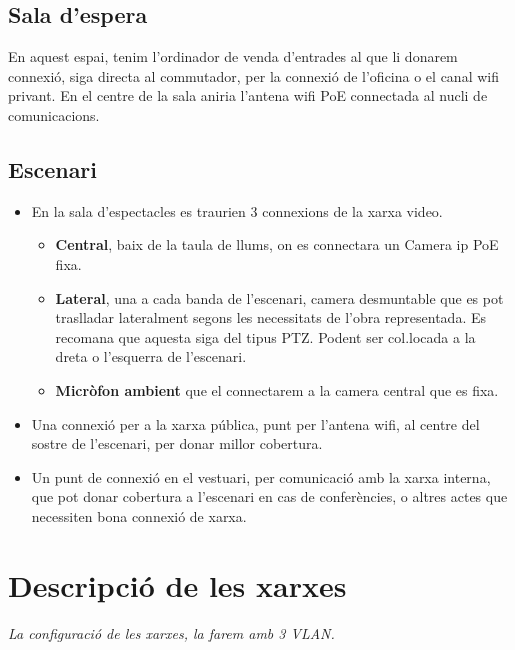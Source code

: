 \documentclass[
  10pt,
]{krantz}
\providecommand{\tightlist}{%
  \setlength{\itemsep}{0pt}\setlength{\parskip}{0pt}}
\begin{document}
\hypertarget{sala-despera}{%
\subsection{Sala d'espera}\label{sala-despera}}

En aquest espai, tenim l'ordinador de venda d'entrades al que li donarem connexió, siga directa al commutador, per la connexió de l'oficina o el canal wifi privant. En el centre de la sala aniria l'antena wifi PoE connectada al nucli de comunicacions.

\hypertarget{escenari}{%
\subsection{Escenari}\label{escenari}}

\begin{itemize}
\item
  En la sala d'espectacles es traurien 3 connexions de la xarxa video.

  \begin{itemize}
  \tightlist
  \item
    \textbf{Central}, baix de la taula de llums, on es connectara un Camera ip PoE fixa.
  \item
    \textbf{Lateral}, una a cada banda de l'escenari, camera desmuntable que es pot traslladar lateralment segons les necessitats de l'obra representada. Es recomana que aquesta siga del tipus PTZ. Podent ser col.locada a la dreta o l'esquerra de l'escenari.
  \item
    \textbf{Micròfon ambient} que el connectarem a la camera central que es fixa.
  \end{itemize}
\item
  Una connexió per a la xarxa pública, punt per l'antena wifi, al centre del sostre de l'escenari, per donar millor cobertura.
\item
  Un punt de connexió en el vestuari, per comunicació amb la xarxa interna, que pot donar cobertura a l'escenari en cas de conferències, o altres actes que necessiten bona connexió de xarxa.
\end{itemize}

\hypertarget{descripciuxf3-de-les-xarxes}{%
\section{Descripció de les xarxes}\label{descripciuxf3-de-les-xarxes}}

\emph{La configuració de les xarxes, la farem amb 3 VLAN.}
\end{document}

